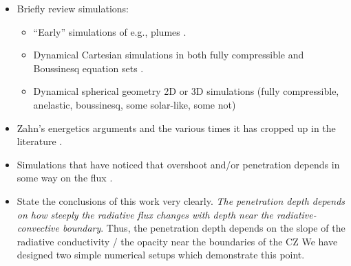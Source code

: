 \documentclass[12pt, fullpage]{article}
\begin{document}
\begin{itemize}
\item Briefly review simulations:
\begin{itemize}
\item ``Early'' simulations of e.g., plumes \citep{schmitt_etal_1984}.
\item Dynamical Cartesian simulations in both fully compressible and Boussinesq equation sets \citep{musman1968, moore_weiss_1973, hurlburt_etal_1986, hurlburt_etal_1994, singh_etal_1995, saikia_etal_2000, brummell_etal_2002, rogers_glatzmaier_2005, kapyla_etal_2007, tian_etal_2009, kitiashvili_etal_2016, lecoanet_etal_2016, kapyla_etal_2017, couston_etal_2017, toppaladoddi_wettlaufer_2018, kapyla2019, cai2020}.
\item Dynamical spherical geometry 2D or 3D simulations (fully compressible, anelastic, boussinesq, some solar-like, some not) \citep{browning_etal_2004, rogers_etal_2006, brun_etal_2017, pratt_etal_2017, dietrich_wicht_2018, higl_etal_2021}
\end{itemize}
\item Zahn's energetics arguments and the various times it has cropped up in the literature \citep{zahn1991, hurlburt_etal_1994, rempel2004, rogers_etal_2006}.
\item Simulations that have noticed that overshoot and/or penetration depends in some way on the flux \citep{singh_etal_1998, hotta2017, kapyla2019}.
\item State the conclusions of this work very clearly. 
\emph{The penetration depth depends on how steeply the radiative flux changes with depth near the radiative-convective boundary}.
Thus, the penetration depth depends on the slope of the radiative conductivity / the opacity near the boundaries of the CZ
We have designed two simple numerical setups which demonstrate this point.
\end{itemize}
\end{document}
